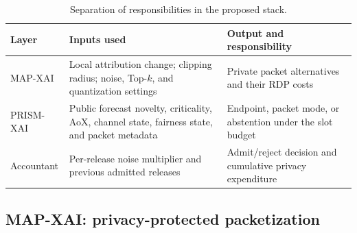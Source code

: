 \documentclass[conference]{IEEEtran}
\begin{document}
\begin{table}[t]
\caption{Separation of responsibilities in the proposed stack.}
\label{tab:roles}
\centering
\scriptsize
\setlength{\tabcolsep}{3.1pt}
\begin{tabular}{p{}p{}p{}}
\toprule
Layer & Inputs used & Output and responsibility\\
\midrule
MAP-XAI & Local attribution change; clipping radius; noise, Top-$k$, and quantization settings & Private packet alternatives and their RDP costs\\
PRISM-XAI & Public forecast novelty, criticality, AoX, channel state, fairness state, and packet metadata & Endpoint, packet mode, or abstention under the slot budget\\
Accountant & Per-release noise multiplier and previous admitted releases & Admit/reject decision and cumulative privacy expenditure\\
\bottomrule
\end{tabular}
\end{table}

\subsection{MAP-XAI: privacy-protected packetization}
\begingroup
\setlength{\abovedisplayskip}{4pt}
\setlength{\belowdisplayskip}{4pt}
\setlength{\abovedisplayshortskip}{2pt}
\setlength{\belowdisplayshortskip}{2pt}
\end{document}
